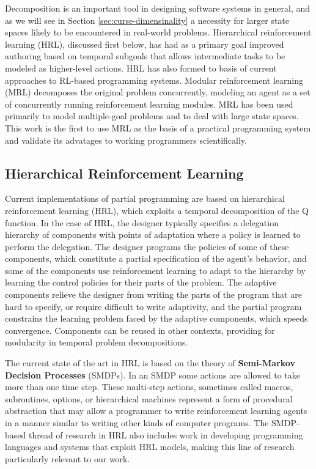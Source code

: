 Decomposition is an important tool in designing software systems in general, and as we will see in Section \ref{sec:curse-dimensinality} a necessity for larger state spaces likely to be encountered in real-world problems. Hierarchical reinforcement learning (HRL), discussed first below, has had as a primary goal improved authoring based on temporal subgoals that allows intermediate tasks to be modeled as higher-level actions. HRL has also formed to basis of current approaches to RL-based programming systems. Modular reinforcement learning (MRL) decomposes the original problem concurrently, modeling an agent as a set of concurrently running reinforcement learning modules. MRL has been used primarily to model multiple-goal problems and to deal with large state spaces. This work is the first to use MRL as the basis of a practical programming system and validate its advatages to working programmers scientifically.

\subsection{Hierarchical Reinforcement Learning}

Current implementations of partial programming are based on hierarchical reinforcement learning (HRL), which exploits a temporal decomposition of the Q function.  In the case of HRL, the designer typically specifies a delegation hierarchy of components with points of adaptation where a policy is learned to perform the delegation.  The designer programs the policies of some of these components, which constitute a partial specification of the agent's behavior, and some of the components use reinforcement learning to adapt to the hierarchy by learning the control policies for their parts of the problem.  The adaptive components relieve the designer from writing the parts of the program that are hard to specify, or require difficult to write adaptivity, and the partial program constrains the learning problem faced by the adaptive components, which speeds convergence.  Components can be reused in other contexts, providing for modularity in temporal problem decompositions.

The current state of the art in HRL is based on the theory of {\bf Semi-Markov Decision Processes} (SMDPs). In an SMDP some actions are allowed to take more than one time step. These multi-step actions, sometimes called macros, subroutines, options, or hierarchical machines represent a form of procedural abstraction that may allow a programmer to write reinforcement learning agents in a manner similar to writing other kinds of computer programs. The SMDP-based thread of research in HRL also includes work in developing programming languages and systems that exploit HRL models, making this line of research particularly relevant to our work.

